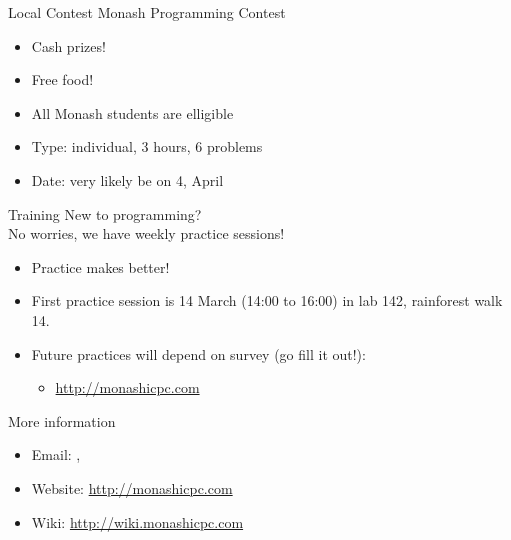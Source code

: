 \documentclass{beamer}
\begin{document}
\begin{frame}{Local Contest}
  Monash Programming Contest
  \begin{itemize}
    \item Cash prizes!
    \item Free food!
    \item All Monash students are elligible
    \item Type: individual, 3 hours, 6 problems
    \item Date: very likely be on 4, April
  \end{itemize}
\end{frame}

\begin{frame}{Training}
  New to programming?\\No worries, we have weekly practice sessions!
  \begin{itemize}
    \item Practice makes  better! 
    \item First practice session is 14 March (14:00 to 16:00) in lab 142, rainforest walk 14.
    \item Future practices will depend on survey (go fill it out!):
      \begin{itemize}
          \item \url{http://monashicpc.com}
      \end{itemize}
  \end{itemize}
\end{frame}

\begin{frame}{More information}
  \begin{itemize}
    \item Email: , 
    \item Website: \url{http://monashicpc.com}
    \item Wiki: \url{http://wiki.monashicpc.com}
  \end{itemize}
\end{frame}
\end{document}
